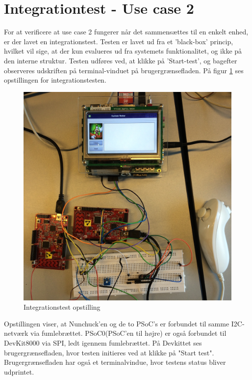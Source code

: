 \section{Integrationtest - Use case 2}
For at verificere at use case 2 fungerer når det sammensættes til en enkelt enhed, er der lavet en integrationstest. Testen er lavet ud fra et 'black-box' princip, hvilket vil sige, at der kun evalueres ud fra systemets funktionalitet, og ikke på den interne struktur.
Testen udføres ved, at klikke på 'Start-test', og bagefter observeres udskriften på terminal-vinduet på brugergrænsefladen. På figur \ref{figure:IntegrationstestOpstilling} ses opstillingen for integrationstesten.

\begin{figure}[H]
	\includegraphics[width=\textwidth]{Test/images/IntegrationstestProtokoller/opstilling}
	\caption{Integrationstest opstilling}
	\label{figure:IntegrationstestOpstilling}
\end{figure}

Opstillingen viser, at Nunchuck'en og de to PSoC's er forbundet til samme I2C-netværk via fumlebrættet. PSoC0(PSoC'en til højre) er også forbundet til DevKit8000 via SPI, ledt igennem fumlebrættet. På Devkittet ses brugergrænsefladen, hvor testen initieres ved at klikke på "Start test". Brugergrænsefladen har også et terminalvindue, hvor testens status bliver udprintet.

